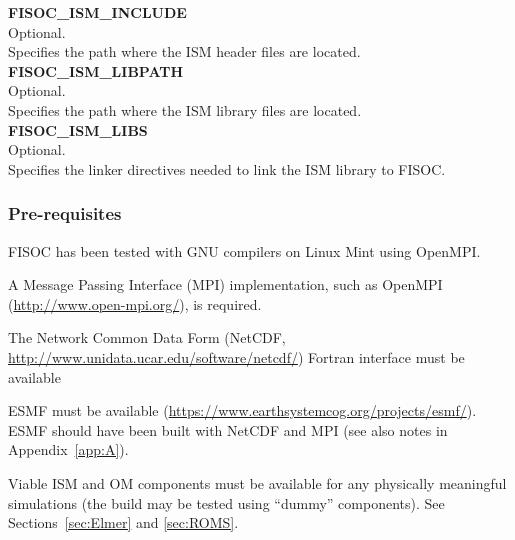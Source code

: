 \documentclass[12pt]{article}
\begin{document}
\begin{flushleft}
\textbf{FISOC\_ISM\_INCLUDE}                       \\ 
Optional.                                          \\
Specifies the path where the ISM header files are located.\\
\vspace{6pt}
\textbf{FISOC\_ISM\_LIBPATH}                       \\
Optional.                                          \\
Specifies the path where the ISM library files are located.\\
\vspace{6pt}
\textbf{FISOC\_ISM\_LIBS}                          \\
Optional.                                          \\
Specifies the linker directives needed to link the ISM library to FISOC. \\
\end{flushleft}



\subsubsection{Pre-requisites}
\label{sec:PreReq}

FISOC has been tested with GNU compilers on Linux Mint using OpenMPI. 

A Message Passing Interface (MPI) implementation, such as 
OpenMPI (\url{http://www.open-mpi.org/}), is required. 

The Network Common Data Form (NetCDF,  
\url{http://www.unidata.ucar.edu/software/netcdf/}) 
Fortran interface must be available 

ESMF must be available (\url{https://www.earthsystemcog.org/projects/esmf/}).  
ESMF should have been built with NetCDF and MPI 
(see also notes in Appendix~\ref{app:A}).


Viable ISM and OM components must be available for any physically meaningful simulations
(the build may be tested using ``dummy'' components).  
See Sections~\ref{sec:Elmer} and \ref{sec:ROMS}.
\end{document}
